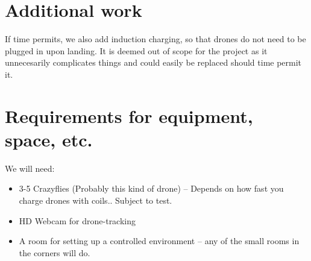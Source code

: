 \documentclass[11pt]{article} %
\begin{document}
\section{Additional work}
If time permits, we also add induction charging, so that drones do not need to be plugged in upon landing. It is deemed out of scope for the project as it unnecesarily complicates things and could easily be replaced should time permit it.


\section{Requirements for equipment, space, etc.}
We will need:
\begin{itemize}
\item 3-5 Crazyflies (Probably this kind of drone) -- Depends on how fast you charge drones with coils.. Subject to test.
\item HD Webcam for drone-tracking
\item A room for setting up a controlled environment -- any of the small rooms in the corners will do.
\end{itemize}
\end{document}
